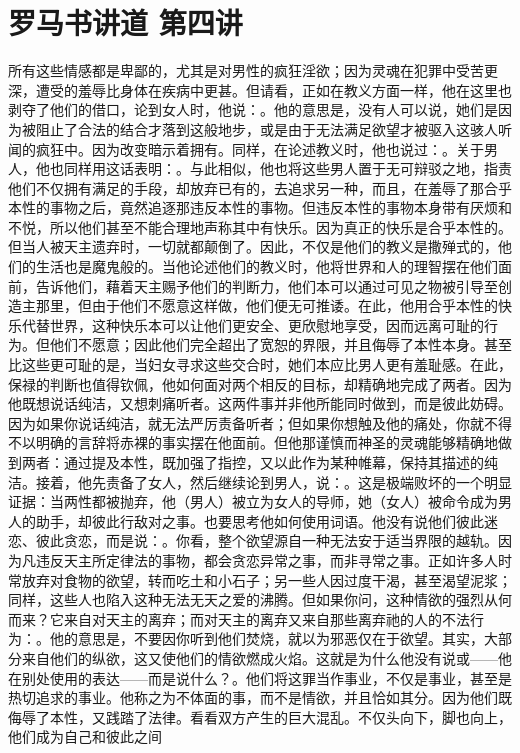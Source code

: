 
\section{罗马书讲道 第四讲}

\par

\par

所有这些情感都是卑鄙的，尤其是对男性的疯狂淫欲；因为灵魂在犯罪中受苦更深，遭受的羞辱比身体在疾病中更甚。但请看，正如在教义方面一样，他在这里也剥夺了他们的借口，论到女人时，他说：。他的意思是，没有人可以说，她们是因为被阻止了合法的结合才落到这般地步，或是由于无法满足欲望才被驱入这骇人听闻的疯狂中。因为改变暗示着拥有。同样，在论述教义时，他也说过：。关于男人，他也同样用这话表明：。与此相似，他也将这些男人置于无可辩驳之地，指责他们不仅拥有满足的手段，却放弃已有的，去追求另一种，而且，在羞辱了那合乎本性的事物之后，竟然追逐那违反本性的事物。但违反本性的事物本身带有厌烦和不悦，所以他们甚至不能合理地声称其中有快乐。因为真正的快乐是合乎本性的。但当人被天主遗弃时，一切就都颠倒了。因此，不仅是他们的教义是撒殚式的，他们的生活也是魔鬼般的。当他论述他们的教义时，他将世界和人的理智摆在他们面前，告诉他们，藉着天主赐予他们的判断力，他们本可以通过可见之物被引导至创造主那里，但由于他们不愿意这样做，他们便无可推诿。在此，他用合乎本性的快乐代替世界，这种快乐本可以让他们更安全、更欣慰地享受，因而远离可耻的行为。但他们不愿意；因此他们完全超出了宽恕的界限，并且侮辱了本性本身。甚至比这些更可耻的是，当妇女寻求这些交合时，她们本应比男人更有羞耻感。在此，保禄的判断也值得钦佩，他如何面对两个相反的目标，却精确地完成了两者。因为他既想说话纯洁，又想刺痛听者。这两件事并非他所能同时做到，而是彼此妨碍。因为如果你说话纯洁，就无法严厉责备听者；但如果你想触及他的痛处，你就不得不以明确的言辞将赤裸的事实摆在他面前。但他那谨慎而神圣的灵魂能够精确地做到两者：通过提及本性，既加强了指控，又以此作为某种帷幕，保持其描述的纯洁。接着，他先责备了女人，然后继续论到男人，说：。这是极端败坏的一个明显证据：当两性都被抛弃，他（男人）被立为女人的导师，她（女人）被命令成为男人的助手，却彼此行敌对之事。也要思考他如何使用词语。他没有说他们彼此迷恋、彼此贪恋，而是说：。你看，整个欲望源自一种无法安于适当界限的越轨。因为凡违反天主所定律法的事物，都会贪恋异常之事，而非寻常之事。正如许多人时常放弃对食物的欲望，转而吃土和小石子；另一些人因过度干渴，甚至渴望泥浆；同样，这些人也陷入这种无法无天之爱的沸腾。但如果你问，这种情欲的强烈从何而来？它来自对天主的离弃；而对天主的离弃又来自那些离弃祂的人的不法行为：。他的意思是，不要因你听到他们焚烧，就以为邪恶仅在于欲望。其实，大部分来自他们的纵欲，这又使他们的情欲燃成火焰。这就是为什么他没有说或——他在别处使用的表达——而是说什么？。他们将这罪当作事业，不仅是事业，甚至是热切追求的事业。他称之为不体面的事，而不是情欲，并且恰如其分。因为他们既侮辱了本性，又践踏了法律。看看双方产生的巨大混乱。不仅头向下，脚也向上，他们成为自己和彼此之间